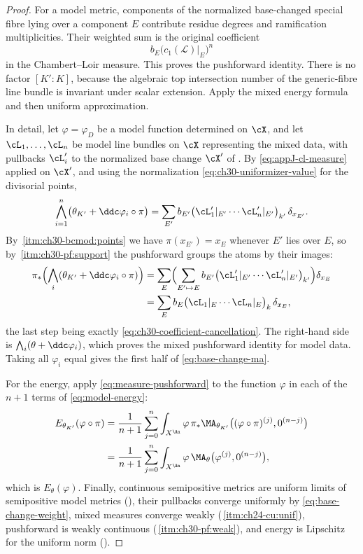 \begin{proof}
For a model metric, components of the normalized base-changed special fibre
lying over a component \(E\) contribute residue degrees and ramification
multiplicities.  Their weighted sum is the original coefficient
\[
 b_E\bigl(c_1(\mathcal L)|_E\bigr)^n
\]
in the Chambert--Loir measure.  This proves the pushforward identity.  There
is no factor \([K':K]\), because the algebraic top intersection number of
the generic-fibre line bundle is invariant under scalar extension.  Apply
the mixed energy formula and then uniform approximation.

In detail, let \(\varphi=\varphi_D\) be a model function determined on
\(\cX\), and let \(\cL_1,\ldots,\cL_n\) be model line bundles on \(\cX\)
representing the mixed data, with pullbacks \(\cL'_i\) to the normalized
base change \(\cX'\) of .  By
\eqref{eq:appJ-cl-measure} applied on \(\cX'\), and using the normalization
\eqref{eq:ch30-uniformizer-value} for the divisorial points,
\[
 \bigwedge_{i=1}^n\bigl(\theta_{K'}+\ddc\varphi_i\circ\pi\bigr)
 =\sum_{E'}b_{E'}
   \bigl(\cL'_1|_{E'}\cdots\cL'_n|_{E'}\bigr)_{k'}\,\delta_{x_{E'}} .
\]
By \,\cref{itm:ch30-bcmod:points} we have
\(\pi(x_{E'})=x_E\) whenever \(E'\) lies over \(E\), so by
\,\cref{itm:ch30-pf:support} the
pushforward groups the atoms by their images:
\[
\begin{aligned}
 \pi_*\Bigl(\bigwedge_i(\theta_{K'}+\ddc\varphi_i\circ\pi)\Bigr)
 &=\sum_E\Bigl(\sum_{E'\mapsto E}b_{E'}
    \bigl(\cL'_1|_{E'}\cdots\cL'_n|_{E'}\bigr)_{k'}\Bigr)\delta_{x_E}\\
 &=\sum_Eb_E\bigl(\cL_1|_E\cdots\cL_n|_E\bigr)_k\,\delta_{x_E},
\end{aligned}
\]
the last step being exactly
\eqref{eq:ch30-coefficient-cancellation}.  The right-hand side is
\(\bigwedge_i(\theta+\ddc\varphi_i)\), which proves the mixed pushforward
identity for model data.  Taking all \(\varphi_i\) equal gives the first
half of \eqref{eq:base-change-ma}.

For the energy, apply \eqref{eq:measure-pushforward} to the function
\(\varphi\) in each of the \(n+1\) terms of \eqref{eq:model-energy}:
\[
\begin{aligned}
 E_{\theta_{K'}}(\varphi\circ\pi)
 &=\frac1{n+1}\sum_{j=0}^n\int_{X^{\An}}\varphi\,
   \pi_*\MA_{\theta_{K'}}\bigl((\varphi\circ\pi)^{(j)},0^{(n-j)}\bigr)\\
 &=\frac1{n+1}\sum_{j=0}^n\int_{X^{\An}}\varphi\,
   \MA_\theta\bigl(\varphi^{(j)},0^{(n-j)}\bigr),
\end{aligned}
\]
which is \(E_\theta(\varphi)\).  Finally, continuous semipositive metrics
are uniform limits of semipositive model metrics
(), their pullbacks converge uniformly by
\eqref{eq:base-change-weight}, mixed measures converge weakly
(\,\cref{itm:ch24-cu:unif}), pushforward
is weakly continuous
(\,\cref{itm:ch30-pf:weak}), and energy is
Lipschitz for the uniform norm ().
\end{proof}

